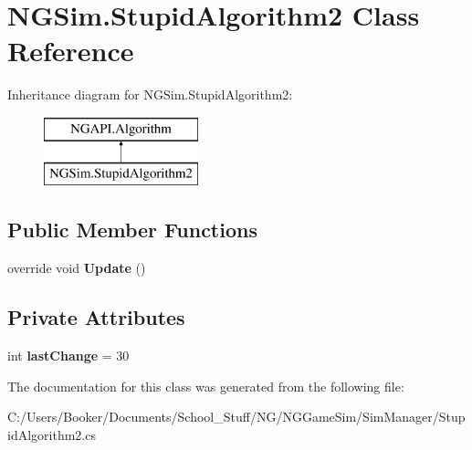 \hypertarget{class_n_g_sim_1_1_stupid_algorithm2}{}\section{N\+G\+Sim.\+Stupid\+Algorithm2 Class Reference}
\label{class_n_g_sim_1_1_stupid_algorithm2}
Inheritance diagram for N\+G\+Sim.\+Stupid\+Algorithm2\+:\begin{figure}[H]
\begin{center}
\leavevmode
\includegraphics[height=2.000000cm]{class_n_g_sim_1_1_stupid_algorithm2}
\end{center}
\end{figure}
\subsection*{Public Member Functions}
\begin{DoxyCompactItemize}
\item 
\mbox{\label{class_n_g_sim_1_1_stupid_algorithm2_ae79a3699521257939d7480c4cd7250a7}} 
override void {\bfseries Update} ()
\end{DoxyCompactItemize}
\subsection*{Private Attributes}
\begin{DoxyCompactItemize}
\item 
\mbox{\label{class_n_g_sim_1_1_stupid_algorithm2_a1e761c86a26adf3d2d016b3913194bc4}} 
int {\bfseries last\+Change} = 30
\end{DoxyCompactItemize}


The documentation for this class was generated from the following file\+:\begin{DoxyCompactItemize}
\item 
C\+:/\+Users/\+Booker/\+Documents/\+School\+\_\+\+Stuff/\+N\+G/\+N\+G\+Game\+Sim/\+Sim\+Manager/Stupid\+Algorithm2.\+cs\end{DoxyCompactItemize}
